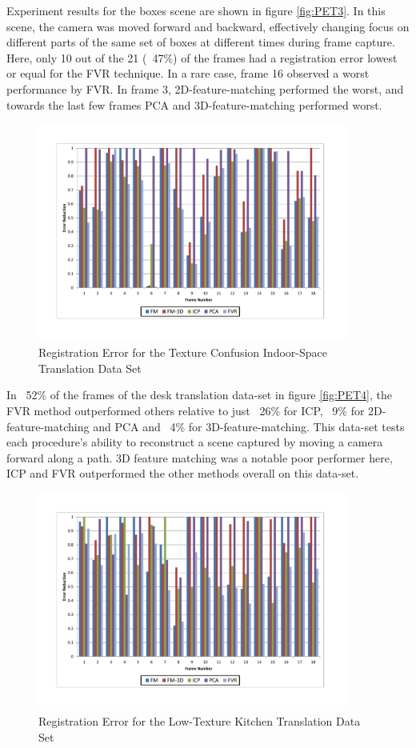 Experiment results for the boxes scene are shown in figure \ref{fig:PET3}. In this scene, the camera was moved forward and backward, effectively changing focus on different parts of the same set of boxes at different times during frame capture. Here, only 10 out of the 21 (~47\%) of the frames had a registration error lowest or equal for the FVR technique. In a rare case, frame 16 observed a worst performance by FVR. In frame 3, 2D-feature-matching performed the worst, and towards the last few frames PCA and 3D-feature-matching performed worst. \\

\begin{figure}[!htb]
\centering
\includegraphics[width=4.0in]{images/results/IndoorSpace_texture_confusion_translation}
\caption{Registration Error for the Texture Confusion Indoor-Space Translation Data Set}
\label{fig:PET5}
\end{figure}

In ~52\% of the frames of the desk translation data-set in figure \ref{fig:PET4}, the FVR method outperformed others relative to just ~26\% for ICP, ~9\% for 2D-feature-matching and PCA and ~4\% for 3D-feature-matching. This data-set tests each procedure's ability to reconstruct a scene captured by moving a camera forward along a path. 3D feature matching was a notable poor performer here, ICP and FVR outperformed the other methods overall on this data-set. \\


\begin{figure}[!htb]
\centering
\includegraphics[width=4.0in]{images/results/Kitchen_LittleTexture_Pan}
\caption{Registration Error for the Low-Texture Kitchen Translation Data Set}
\label{fig:PET6}
\end{figure}

